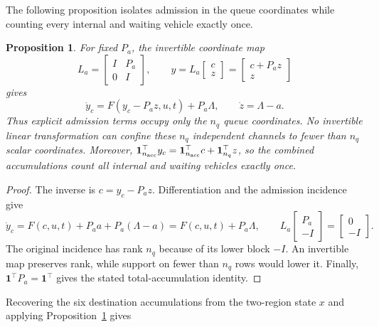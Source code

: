 \documentclass[preprint,12pt]{elsarticle}
\theoremstyle{definition}
\theoremstyle{plain}
\newtheorem{proposition}{Proposition}
\theoremstyle{definition}
\theoremstyle{plain}
\begin{document}
The following proposition isolates admission in the queue coordinates
while counting every internal and waiting vehicle exactly once.

\begin{proposition}
\label{prop:network-localization}
For fixed $P_a$, the invertible coordinate map
\begin{equation}
 L_a=\begin{bmatrix}I&P_a\\0&I\end{bmatrix},\qquad
 y=L_a\begin{bmatrix}c\\z\end{bmatrix}
   =\begin{bmatrix}c+P_a z\\z\end{bmatrix}
 \label{eq:network-transform}
\end{equation}
gives
\begin{equation}
 \dot y_c=F(y_c-P_a z,u,t)+P_a\Lambda,\qquad
 \dot z=\Lambda-a.
 \label{eq:network-transformed-flow}
\end{equation}
Thus explicit admission terms occupy only the $n_q$ queue coordinates. No
invertible linear transformation can confine these $n_q$ independent channels
to fewer than $n_q$ scalar coordinates. Moreover,
$\mathbf1_{n_{\rm acc}}^\top y_c=\mathbf1_{n_{\rm acc}}^\top c+\mathbf1_{n_q}^\top z$, so the combined
accumulations count all internal and waiting vehicles exactly once.
\end{proposition}

\begin{proof}
The inverse is $c=y_c-P_a z$. Differentiation and the admission
incidence give
\[
\dot y_c=F(c,u,t)+P_a a+P_a(\Lambda-a)=F(c,u,t)+P_a\Lambda,
\qquad
L_a\begin{bmatrix}P_a\\-I\end{bmatrix}=\begin{bmatrix}0\\-I\end{bmatrix}.
\]
The original incidence has rank $n_q$ because of its lower block $-I$.
An invertible map preserves rank, while support on fewer than $n_q$ rows
would lower it. Finally, $\mathbf1^\top P_a=\mathbf1^\top$ gives the
stated total-accumulation identity.
\end{proof}

Recovering the six destination accumulations from the two-region state
$x$ and applying Proposition~\ref{prop:network-localization} gives
\end{document}
